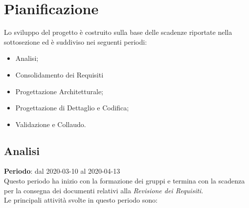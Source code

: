 \section{Pianificazione}
Lo sviluppo del progetto è costruito sulla base delle scadenze riportate nella sottosezione  ed è suddiviso nei seguenti periodi:
\begin{itemize}
	\item Analisi;
	\item Consolidamento dei Requisiti
	\item Progettazione Architetturale;
	\item Progettazione di Dettaglio e Codifica;
	\item Validazione e Collaudo.
\end{itemize}

\subsection{Analisi}
\textbf{Periodo}: dal 2020-03-10 al 2020-04-13 \\
Questo periodo ha inizio con la formazione dei gruppi e termina con la scadenza per la consegna dei documenti relativi alla \textit{Revisione dei Requisiti}. \\
Le principali attività svolte in questo periodo sono:
